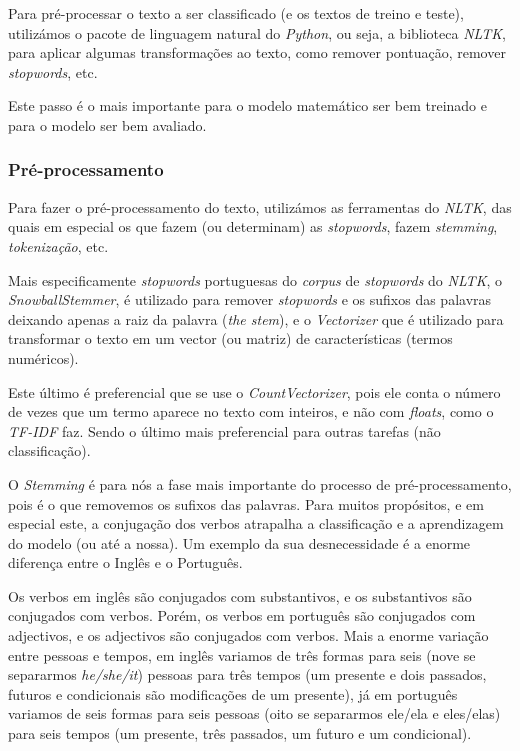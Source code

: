 Para pré-processar o texto a ser classificado (e os textos de treino e teste), utilizámos o pacote de linguagem natural do \textit{Python}, ou seja, a biblioteca \textit{NLTK}, para aplicar algumas transformações ao texto, como remover pontuação, remover \textit{stopwords}, etc.

Este passo é o mais importante para o modelo matemático ser bem treinado e para o modelo ser bem avaliado.

\subsubsection{Pré-processamento}

Para fazer o pré-processamento do texto, utilizámos as ferramentas do \textit{NLTK}, das quais em especial os que fazem (ou determinam) as \textit{stopwords}, fazem \textit{stemming}, \textit{tokenização}, etc.

Mais especificamente \textit{stopwords} portuguesas do \textit{corpus} de \textit{stopwords} do \textit{NLTK}, o \textit{SnowballStemmer}, é utilizado para remover \textit{stopwords} e os sufixos das palavras deixando apenas a raiz da palavra (\textit{the stem}), e o \textit{Vectorizer} que é utilizado para transformar o texto em um vector (ou matriz) de características (termos numéricos).

Este último é preferencial que se use o \textit{CountVectorizer}, pois ele conta o número de vezes que um termo aparece no texto com inteiros, e não com \textit{floats}, como o \textit{TF-IDF} faz. Sendo o último mais preferencial para outras tarefas (não classificação).

O \textit{Stemming} é para nós a fase mais importante do processo de pré-processamento, pois é o que removemos os sufixos das palavras.
Para muitos propósitos, e em especial este, a conjugação dos verbos atrapalha a classificação e a aprendizagem do modelo (ou até a nossa). Um exemplo da sua desnecessidade é a enorme diferença entre o Inglês e o Português.

Os verbos em inglês são conjugados com substantivos, e os substantivos são conjugados com verbos. Porém, os verbos em português são conjugados com adjectivos, e os adjectivos são conjugados com verbos. Mais a enorme variação entre pessoas e tempos, em inglês variamos de três formas para seis (nove se separarmos \textit{he/she/it}) pessoas para três tempos (um presente e dois passados, futuros e condicionais são modificações de um presente), já em português variamos de seis formas para seis pessoas (oito se separarmos ele/ela e eles/elas) para seis tempos (um presente, três passados, um futuro e um condicional).

